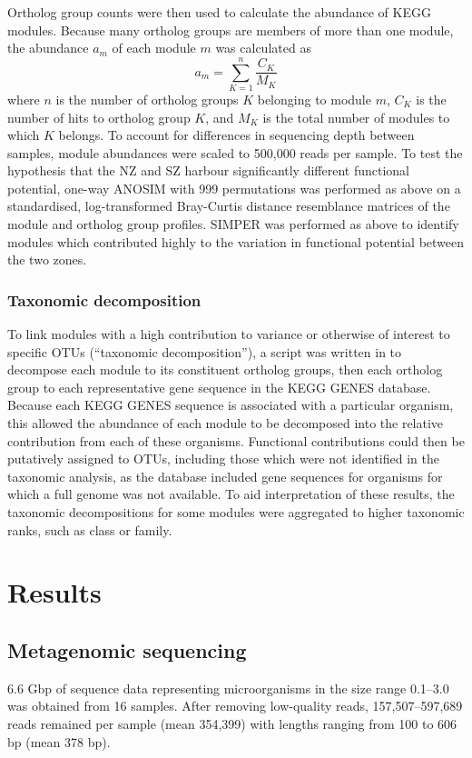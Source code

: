 Ortholog group counts were then used to calculate the abundance of KEGG modules.
Because many ortholog groups are members of more than one module, the abundance $a_m$ of each module $m$ was calculated as 
\[
a_{m}=\sum_{K=1}^{n}\frac{C_{K}}{M_K}
\]
where $n$ is the number of ortholog groups $K$ belonging to module $m$, $C_{K}$ is the number of hits to ortholog group $K$, and $M_{K}$ is the total number of modules to which $K$ belongs.
To account for differences in sequencing depth between samples, module abundances were scaled to 500,000 reads per sample.
To test the hypothesis that the \ac{NZ} and \ac{SZ} harbour significantly different functional potential, one-way \ac{ANOSIM} with 999 permutations was performed as above on a standardised, log-transformed Bray-Curtis distance resemblance matrices of the module and ortholog group profiles.
\ac{SIMPER} was performed as above to identify modules which contributed highly to the variation in functional potential between the two zones.

\subsubsection{Taxonomic decomposition}

To link modules with a high contribution to variance or otherwise of interest to specific \acp{OTU} (``taxonomic decomposition''), a script was written in  to decompose each module to its constituent ortholog groups, then each ortholog group to each representative gene sequence in the \ac{KEGG} GENES database.
Because each \ac{KEGG} GENES sequence is associated with a particular organism, this allowed the abundance of each module to be decomposed into the relative contribution from each of these organisms.
Functional contributions could then be putatively assigned to \acp{OTU}, including those which were not identified in the taxonomic analysis, as the database included gene sequences for organisms for which a full genome was not available.
To aid interpretation of these results, the taxonomic decompositions for some modules were aggregated to higher taxonomic ranks, such as class or family.

\section{Results}

\subsection{Metagenomic sequencing}
6.6 Gbp of sequence data representing microorganisms in the size range 0.1--3.0 \micron{} was obtained from 16 samples. 
After removing low-quality reads, 157,507--597,689 reads remained per sample (mean 354,399) with lengths ranging from 100 to 606 bp (mean 378 bp).

